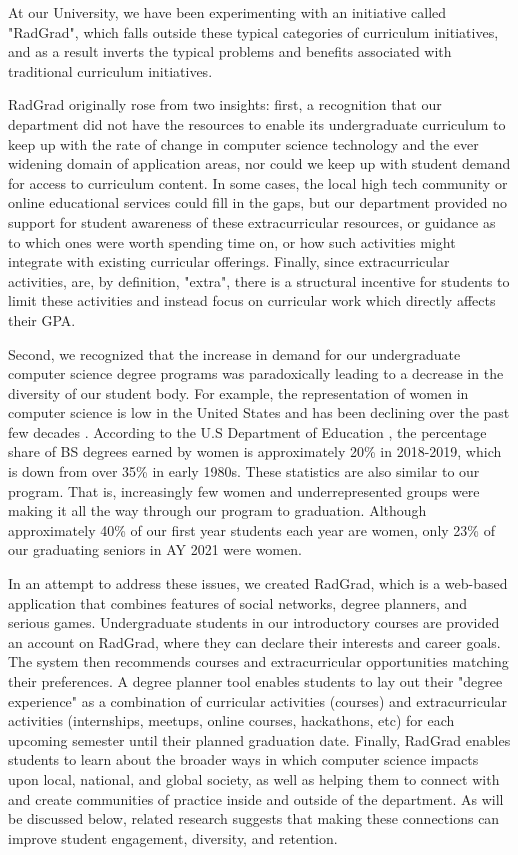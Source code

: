 \documentclass[acmsmall]{acmart}
\begin{document}
At our University, we have been experimenting with an initiative called "RadGrad", which falls outside these typical categories of curriculum initiatives, and as a result inverts the typical problems and benefits associated with traditional curriculum initiatives.

RadGrad originally rose from two insights: first, a recognition that our department did not have the resources to enable its undergraduate curriculum to keep up with the rate of change in computer science technology and the ever widening domain of application areas, nor could we keep up with student demand for access to curriculum content.  In some cases, the local high tech community or online educational services could fill in the gaps, but our department provided no support for student awareness of these extracurricular resources, or guidance as to which ones were worth spending time on, or how such activities might integrate with existing curricular offerings.  Finally, since extracurricular activities, are, by definition, "extra", there is a structural incentive for students to limit these activities and instead focus on curricular work which directly affects their GPA.

Second, we recognized that the increase in demand for our undergraduate computer science degree programs was paradoxically leading to a decrease in the diversity of our student body. For example, the representation of women in computer science is low in the United States and has been declining over the past few decades \cite{moudgalya_computer_2019}. According to the U.S Department of Education \cite{us_department_of_education_digest_2019}, the percentage share of BS degrees earned by women is approximately 20\% in 2018-2019, which is down from over 35\% in early 1980s. These statistics are also similar to our program. That is, increasingly few women and underrepresented groups were making it all the way through our program to graduation. Although approximately 40\% of our first year students each year are women, only 23\% of our graduating seniors in AY 2021 were women.

In an attempt to address these issues, we created RadGrad, which is a web-based application that combines features of social networks, degree planners, and serious games.  Undergraduate students in our introductory courses are provided an account on RadGrad, where they can declare their interests and career goals. The system then recommends courses and extracurricular opportunities matching their preferences. A degree planner tool enables students to lay out their "degree experience" as a combination of curricular activities (courses) and extracurricular activities (internships, meetups, online courses, hackathons, etc) for each upcoming semester until their planned graduation date. Finally, RadGrad enables students to learn about the broader ways in which computer science impacts upon local, national, and global society, as well as helping them to connect with and create communities of practice inside and outside of the department. As will be discussed below, related research suggests that making these connections can improve student engagement, diversity, and retention.
\end{document}
